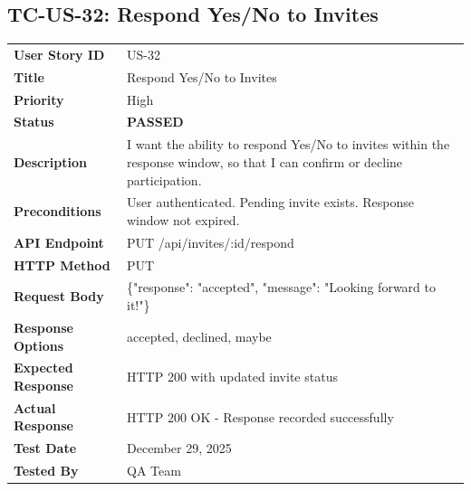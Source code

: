 \documentclass[11pt,a4paper]{article}
\newcommand{\passed}{\textcolor{pass}{\textbf{PASSED}}}
\begin{document}
\vspace{0.5cm}


\subsection{TC-US-32: Respond Yes/No to Invites}

\begin{tabularx}{\textwidth}{|p{3.2cm}|Y|}
\hline
{}
 \\
\hline
\textbf{User Story ID} & US-32 \\
\hline
\textbf{Title} & Respond Yes/No to Invites \\
\hline
\textbf{Priority} & High \\
\hline
\textbf{Status} & \passed \\
\hline
\textbf{Description} & I want the ability to respond Yes/No to invites within the response window, so that I can confirm or decline participation. \\
\hline
\textbf{Preconditions} & User authenticated. Pending invite exists. Response window not expired. \\
\hline
\textbf{API Endpoint} & PUT /api/invites/:id/respond \\
\hline
\textbf{HTTP Method} & PUT \\
\hline
\textbf{Request Body} & \{"response": "accepted", "message": "Looking forward to it!"\} \\
\hline
\textbf{Response Options} & accepted, declined, maybe \\
\hline
\textbf{Expected Response} & HTTP 200 with updated invite status \\
\hline
\textbf{Actual Response} & HTTP 200 OK - Response recorded successfully \\
\hline
\textbf{Test Date} & December 29, 2025 \\
\hline
\textbf{Tested By} & QA Team \\
\hline
\end{tabularx}
\end{document}
